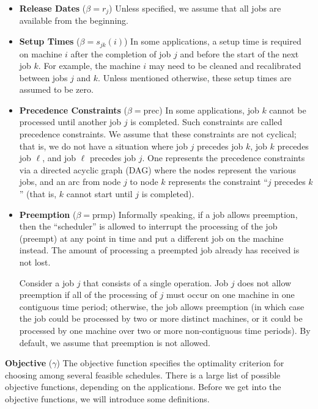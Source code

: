 \begin{itemize}

    \item {\bf Release Dates} ($\beta = r_j$) Unless specified, we assume 
    that all jobs are available from the beginning.

    \item {\bf Setup Times} ($\beta = s_{jk}(i)$) In some applications, a 
    setup time is required on machine $i$ after the completion of job $j$ 
    and before the start of the next job $k$. For example, the machine $i$ 
    may need to be cleaned and recalibrated between jobs $j$ and $k$. Unless
    mentioned otherwise, these setup times are assumed to be zero.

    \item {\bf Precedence Constraints} ($\beta = \text{prec}$) In some applications, 
    job $k$ cannot be processed until another job $j$ is completed. Such 
    constraints are called precedence constraints. We assume that these 
    constraints are not cyclical; that is, we do not have a situation
    where job $j$ precedes job $k$, job $k$ precedes job $\ell$, and job 
    $\ell$ precedes job $j$. One represents the precedence constraints via a 
    directed acyclic graph (DAG) where the nodes represent the various jobs, 
    and an arc from node $j$ to node $k$ represents the constraint ``$j$ 
    precedes $k$'' (that is, $k$ cannot start until $j$ is completed).

    \item {\bf Preemption} ($\beta = \text{prmp}$) Informally speaking, if a job 
    allows preemption, then the ``scheduler'' is allowed to interrupt the 
    processing of the job (preempt) at any point in time and put a different 
    job on the machine instead. The amount of processing a preempted job 
    already has received is not lost.

    Consider a job $j$ that consists of a single operation. Job $j$ does 
    not allow preemption if all of the processing of $j$ must occur on one 
    machine in one contiguous time period; otherwise, the job allows preemption 
    (in which case the job could be processed by two or more distinct machines,
    or it could be processed by one machine over two or more non-contiguous 
    time periods). By default, we assume that preemption is not allowed. 

\end{itemize}

{\bf Objective} ($\gamma$) The objective function specifies the optimality 
criterion for choosing among several feasible schedules. There is a large list
of possible objective functions, depending on the applications. Before we get 
into the objective functions, we will introduce some definitions.

